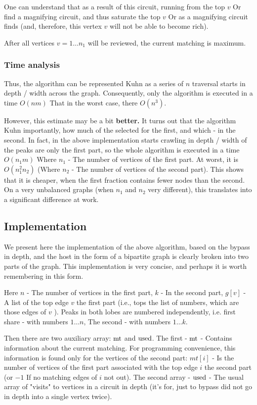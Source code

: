 One can understand that as a result of this circuit, running from the top $v$ Or find a magnifying circuit, and thus saturate the top $v$ Or as a magnifying circuit finds (and, therefore, this vertex $v$ will not be able to become rich).

After all vertices $v = 1 \ldots n_1$ will be reviewed, the current matching is maximum.

\subsubsection{ Time analysis }

Thus, the algorithm can be represented Kuhn as a series of $n$ traversal starts in depth / width across the graph. Consequently, only the algorithm is executed in a time $O (n m)$ That in the worst case, there $O (n ^ 3)$.

However, this estimate may be a bit \textbf{better.} It turns out that the algorithm Kuhn importantly, how much of the selected for the first, and which - in the second. In fact, in the above implementation starts crawling in depth / width of the peaks are only the first part, so the whole algorithm is executed in a time $O (n_1 m)$ Where $n_1$ - The number of vertices of the first part. At worst, it is $O (n_1 ^ 2 n_2)$ (Where $n_2$ - The number of vertices of the second part). This shows that it is cheaper, when the first fraction contains fewer nodes than the second. On a very unbalanced graphs (when $n_1$ and $n_2$ very different), this translates into a significant difference at work.

\subsection{ Implementation }

We present here the implementation of the above algorithm, based on the bypass in depth, and the host in the form of a bipartite graph is clearly broken into two parts of the graph. This implementation is very concise, and perhaps it is worth remembering in this form.

Here $n$ - The number of vertices in the first part, $k$ - In the second part, $g [v]$ - A list of the top edge $v$ the first part (i.e., tops the list of numbers, which are those edges of $v$ ). Peaks in both lobes are numbered independently, i.e. first share - with numbers $1 \ldots n$, The second - with numbers $1 \ldots k$.

Then there are two auxiliary array: $\rm mt$ and $\rm used$. The first - $\rm mt$ - Contains information about the current matching. For programming convenience, this information is found only for the vertices of the second part: $mt [i]$ - Is the number of vertices of the first part associated with the top edge $i$ the second part (or $-1$ If no matching edges of $i$ not out). The second array - $\rm used$ - The usual array of "visits" to vertices in a circuit in depth (it's for, just to bypass did not go in depth into a single vertex twice).

